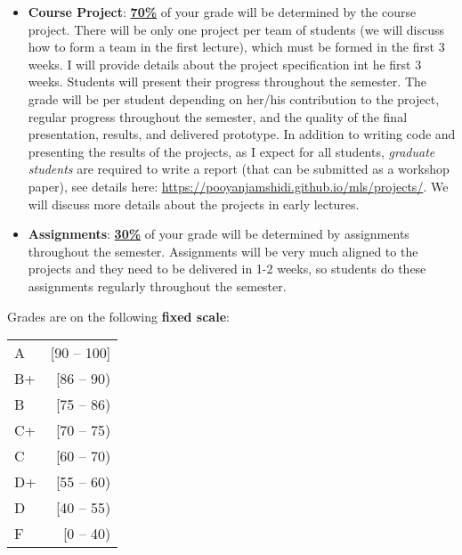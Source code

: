 \documentclass[11pt]{article}
\begin{document}
\begin{itemize}

  \item \textbf{Course Project}: \underline{\textbf{70\%}} of your grade will be determined by the course project. There will be only one project per team of students (we will discuss how to form a team in the first lecture), which must be formed in the first 3 weeks. I will provide details about the project specification int he first 3 weeks. Students will present their progress throughout the semester. The grade will be per student depending on her/his contribution to the project, regular progress throughout the semester, and the quality of the final presentation, results, and delivered prototype. In addition to writing code and presenting the results of the projects, as I expect for all students, \emph{graduate students} are required to write a report (that can be submitted as a workshop paper), see details here: \url{https://pooyanjamshidi.github.io/mls/projects/}. We will discuss more details about the projects in early lectures.

  \item \textbf{Assignments}: \underline{\textbf{30\%}} of your grade will be determined by assignments throughout the semester. Assignments will be very much aligned to the projects and they need to be delivered in 1-2 weeks, so students do these assignments regularly throughout the semester.


\end{itemize}


Grades are on the following \textbf{fixed scale}:

\begin{tabular}{lr}
A & [90 -- 100] \\
B+ &  [86 -- 90) \\
B & [75 -- 86)\\
C+  & [70 -- 75)\\
C&  [60 -- 70)\\
D+ &  [55 -- 60)\\
D & [40 -- 55)\\
F & [0 -- 40)\\

\end{tabular}
\end{document}
